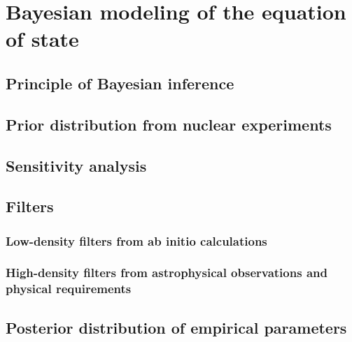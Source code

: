 \section{Bayesian modeling of the equation of state} %

\subsection{Principle of Bayesian inference} %


\subsection{Prior distribution from nuclear experiments} %

\subsection{Sensitivity analysis} %

\subsection{Filters} %

\subsubsection{Low-density filters from ab initio calculations} %


\subsubsection{High-density filters from astrophysical observations and 
physical requirements} %


\subsection{Posterior distribution of empirical parameters} %

